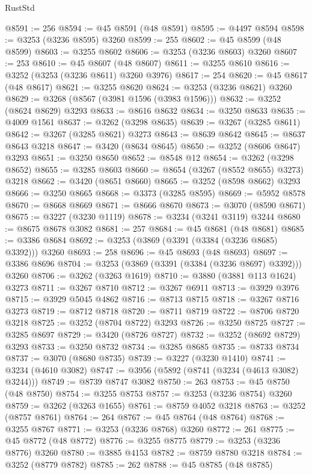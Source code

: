 \begin{lexlean}{RustStd}
\begin{coremodule}
@8591 := 256
@8594 := @45 @8591 (@48 @8591)
@8595 := @4497 @8594
@8598 := @3253 (@3236 @8595) @3260
@8599 := 255
@8602 := @45 @8599 (@48 @8599)
@8603 := @3255 @8602
@8606 := @3253 (@3236 @8603) @3260
@8607 := 253
@8610 := @45 @8607 (@48 @8607)
@8611 := @3255 @8610
@8616 := @3252 (@3253 (@3236 @8611) @3260 @3976)
@8617 := 254
@8620 := @45 @8617 (@48 @8617)
@8621 := @3255 @8620
@8624 := @3253 (@3236 @8621) @3260
@8629 := @3268 (@8567 (@3981 @1596 (@3983 @1596)))
@8632 := @3252 (@8624 @8629) @3293
@8633 := @8616 @8632
@8634 := @3250 @8633
@8635 := @4009 @1561
@8637 := @3262 (@3298 @8635)
@8639 := @3267 (@3285 @8611)
@8642 := @3267 (@3285 @8621) @3273
@8643 := @8639 @8642
@8645 := @8637 @8643 @3218
@8647 := @3420 (@8634 @8645)
@8650 := @3252 (@8606 @8647) @3293
@8651 := @3250 @8650
@8652 := @8548 @12
@8654 := @3262 (@3298 @8652)
@8655 := @3285 @8603
@8660 := @8654 (@3267 (@8552 @8655) @3273) @3218
@8662 := @3420 (@8651 @8660)
@8665 := @3252 (@8598 @8662) @3293
@8666 := @3250 @8665
@8668 := @3373 (@3285 @8595)
@8669 := @5952 @8578
@8670 := @8668 @8669
@8671 := @8666 @8670
@8673 := @3070 (@8590 @8671)
@8675 := @3227 (@3230 @1119)
@8678 := @3234 (@3241 @3119) @3244
@8680 := @8675 @8678 @3082
@8681 := 257
@8684 := @45 @8681 (@48 @8681)
@8685 := @3386 @8684
@8692 := @3253 (@3869 (@3391 (@3384 (@3236 @8685) @3392))) @3260
@8693 := 258
@8696 := @45 @8693 (@48 @8693)
@8697 := @3386 @8696
@8704 := @3253 (@3869 (@3391 (@3384 (@3236 @8697) @3392))) @3260
@8706 := @3262 (@3263 @1619)
@8710 := @3880 (@3881 @113 @1624) @3273
@8711 := @3267 @8710
@8712 := @3267 @6911
@8713 := @3929 @3976
@8715 := @3929 @5045 @4862
@8716 := @8713 @8715
@8718 := @3267 @8716 @3273
@8719 := @8712 @8718
@8720 := @8711 @8719
@8722 := @8706 @8720 @3218
@8725 := @3252 (@8704 @8722) @3293
@8726 := @3250 @8725
@8727 := @3285 @8697
@8729 := @3420 (@8726 @8727)
@8732 := @3252 (@8692 @8729) @3293
@8733 := @3250 @8732
@8734 := @3285 @8685
@8735 := @8733 @8734
@8737 := @3070 (@8680 @8735)
@8739 := @3227 (@3230 @1410)
@8741 := @3234 (@4610 @3082)
@8747 := @3956 (@5892 (@8741 (@3234 (@4613 @3082) @3244)))
@8749 := @8739 @8747 @3082
@8750 := 263
@8753 := @45 @8750 (@48 @8750)
@8754 := @3255 @8753
@8757 := @3253 (@3236 @8754) @3260
@8759 := @3262 (@3263 @1655)
@8761 := @8759 @4052 @3218
@8763 := @3252 (@8757 @8761)
@8764 := 264
@8767 := @45 @8764 (@48 @8764)
@8768 := @3255 @8767
@8771 := @3253 (@3236 @8768) @3260
@8772 := 261
@8775 := @45 @8772 (@48 @8772)
@8776 := @3255 @8775
@8779 := @3253 (@3236 @8776) @3260
@8780 := @3885 @4153
@8782 := @8759 @8780 @3218
@8784 := @3252 (@8779 @8782)
@8785 := 262
@8788 := @45 @8785 (@48 @8785)

\end{coremodule}
\end{lexlean}
